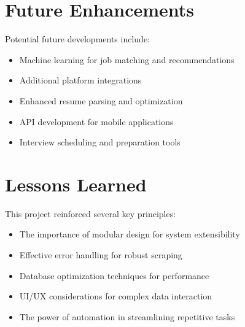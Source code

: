 \documentclass[12pt,a4paper]{report}
\begin{document}
\section{Future Enhancements}
Potential future developments include:
\begin{itemize}
    \item Machine learning for job matching and recommendations
    \item Additional platform integrations
    \item Enhanced resume parsing and optimization
    \item API development for mobile applications
    \item Interview scheduling and preparation tools
\end{itemize}

\section{Lessons Learned}
This project reinforced several key principles:
\begin{itemize}
    \item The importance of modular design for system extensibility
    \item Effective error handling for robust scraping
    \item Database optimization techniques for performance
    \item UI/UX considerations for complex data interaction
    \item The power of automation in streamlining repetitive tasks
\end{itemize}
\end{document}
